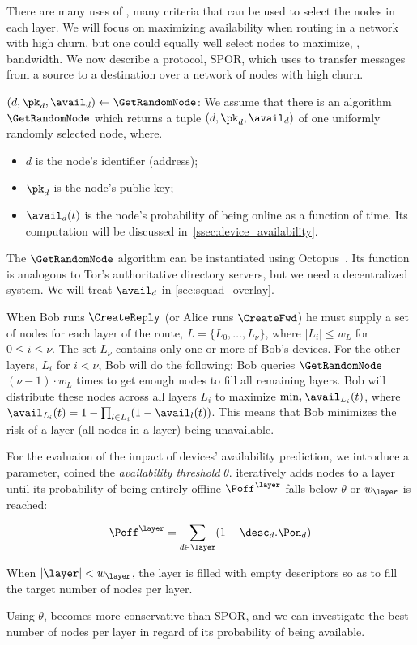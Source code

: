 There are many uses of \Sphinxes, many criteria that can be used to select the 
nodes in each layer.
We will focus on maximizing availability when routing in a network with high 
churn, but one could equally well select nodes to maximize, \eg, bandwidth.
We now describe a protocol, \ac{SPOR}, which uses \Sphinxes to transfer messages 
from a source to a destination over a network of nodes with high churn.

\((d, \pk_d, \avail_d)\gets \GetRandomNode\): We assume that there is an 
algorithm \(\GetRandomNode\) which returns a tuple \((d, \pk_d, \avail_d)\) of 
one uniformly randomly selected node, where.
\begin{itemize}
  \item \(d\) is the node's identifier (address);
  \item \(\pk_d\) is the node's public key;
  \item  \(\avail_d(t)\) is the node's probability of being online as a function of time. 
  Its computation will be discussed in~\ref{ssec:device_availability}.
\end{itemize}
The \(\GetRandomNode\) algorithm can be instantiated using \eg
Octopus~\cite{Octopus}. Its function is analogous to 
Tor's authoritative directory servers, but we need a decentralized system. 
We will treat \(\avail_d\) in \cref{sec:squad_overlay}.

When Bob runs \(\CreateReply\) (or Alice runs \(\CreateFwd\)) he must supply a 
set of nodes for each layer of the route, \(L = \{L_0, \dotsc, L_\nu\}\), where 
\(|L_i| \leq w_L\) for \(0\leq i\leq \nu\).
The set \(L_\nu\) contains only one or more of Bob's devices.
For the other layers, \(L_i\) for \(i < \nu\), Bob will do the following:
Bob queries \(\GetRandomNode\) \((\nu-1)\cdot w_L\) times to get enough nodes 
to fill all remaining layers.
Bob will distribute these nodes across all layers \(L_i\) to maximize \(\min_i 
  \avail_{L_i}(t)\), where \(\avail_{L_i}(t) = 1-\prod_{l\in L_i} 
  (1-\avail_l(t))\).
This means that Bob minimizes the risk of a layer (\ie all nodes in a layer) 
being unavailable.

For the evaluaion of the impact of devices' availability prediction, we introduce a parameter, coined the \emph{availability threshold} $\theta$. 
\CreateLayer iteratively adds nodes to a layer \layer until its probability of being entirely offline $\Poff^\layer$ falls below $\theta$ or $w_\layer$ is reached:

$$ \Poff^\layer = \sum\limits_{d \in \layer}(1 - \desc_d.\Pon_d) $$

When $|\layer| < w_\layer$, the layer is filled with empty descriptors so as to fill the target number of nodes per layer.

Using $\theta$, \name becomes more conservative than \ac{SPOR}, and we can investigate the best number of nodes per layer in regard of its probability of being available.